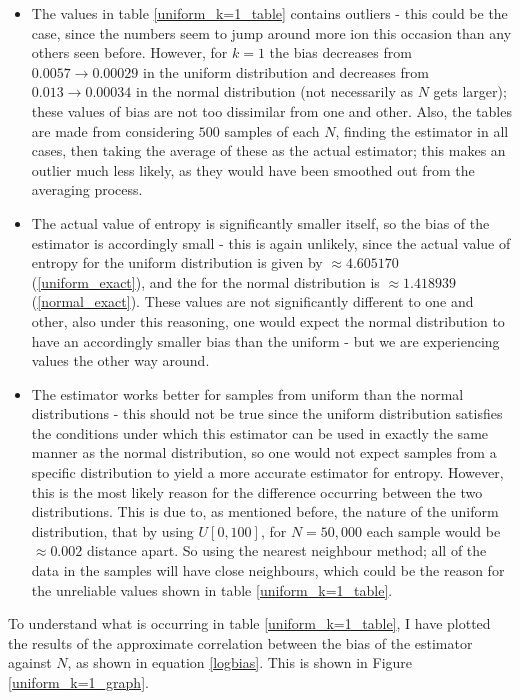 \documentclass{article}
\begin{document}
\begin{itemize}
\item The values in table \ref{uniform_k=1_table} contains outliers - this could be the case, since the numbers seem to jump around more ion this occasion than any others seen before. However, for $k=1$ the bias decreases from $0.0057 \to 0.00029$ in the uniform distribution and decreases from $0.013 \to 0.00034$ in the normal distribution (not necessarily as $N$ gets larger); these values of bias are not too dissimilar from one and other. Also, the tables are made from considering $500$ samples of each $N$, finding the estimator in all cases, then taking the average of these as the actual estimator; this makes an outlier much less likely, as they would have been smoothed out from the averaging process.

\item The actual value of entropy is significantly smaller itself, so the bias of the estimator is accordingly small - this is again unlikely, since the actual value of entropy for the uniform distribution is given by $\approx 4.605170$ (\ref{uniform_exact}), and the for the normal distribution is $\approx 1.418939$ (\ref{normal_exact}). These values are not significantly different to one and other, also under this reasoning, one would expect the normal distribution to have an accordingly smaller bias than the uniform - but we are experiencing values the other way around.

\item The estimator works better for samples from uniform than the normal distributions - this should not be true since the uniform distribution satisfies the conditions under which this estimator can be used in exactly the same manner as the normal distribution, so one would not expect samples from a specific distribution to yield a more accurate estimator for entropy. However, this is the most likely reason for the difference occurring between the two distributions. This is due to, as mentioned before, the nature of the uniform distribution, that by using $U[0, 100]$, for $N=50,000$ each sample would be $\approx 0.002$ distance apart. So using the nearest neighbour method; all of the data in the samples will have close neighbours, which could be the reason for the unreliable values shown in table \ref{uniform_k=1_table}.
\end{itemize}

To understand what is occurring in table \ref{uniform_k=1_table}, I have plotted the results of the approximate correlation between the bias of the estimator against $N$, as shown in equation \ref{logbias}. This is shown in Figure \ref{uniform_k=1_graph}.
\end{document}
